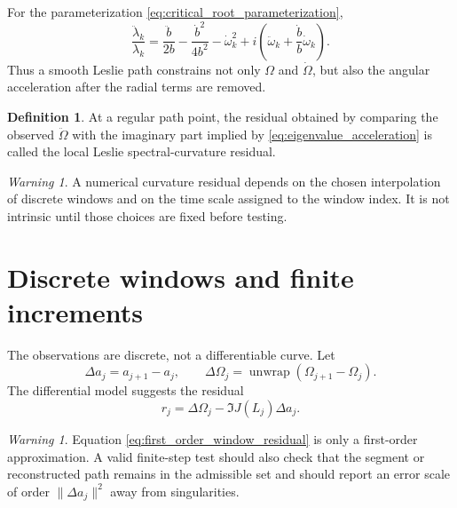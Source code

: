\documentclass[11pt]{amsart}
\numberwithin{equation}{section}
\theoremstyle{plain}
\theoremstyle{definition}
\newtheorem{definition}[theorem]{Definition}
\theoremstyle{remark}
\newtheorem{warning}[theorem]{Warning}
\begin{document}
For the parameterization \eqref{eq:critical_root_parameterization},
\begin{equation}
\frac{\ddot\lambda_k}{\lambda_k}
=
\frac{\ddot b}{2b}
-\frac{\dot b^2}{4b^2}
-\dot\omega_k^2
+i\left(
\ddot\omega_k+\frac{\dot b}{b}\dot\omega_k
\right).
\label{eq:angular_acceleration_identity}
\end{equation}
Thus a smooth Leslie path constrains not only $\Omega$ and $\dot\Omega$, but also the angular acceleration after the radial terms are removed.

\begin{definition}
\label{def:spectral_curvature}
At a regular path point, the residual obtained by comparing the observed $\ddot\Omega$ with the imaginary part implied by \eqref{eq:eigenvalue_acceleration} is called the local Leslie spectral-curvature residual.
\end{definition}

\begin{warning}
\label{warn:curvature_not_intrinsic}
A numerical curvature residual depends on the chosen interpolation of discrete windows and on the time scale assigned to the window index.  It is not intrinsic until those choices are fixed before testing.
\end{warning}

\section{Discrete windows and finite increments}
\label{sec:discrete_windows}

The observations are discrete, not a differentiable curve.  Let
\begin{equation}
\Delta a_j=a_{j+1}-a_j,
\qquad
\Delta\Omega_j=\operatorname{unwrap}(\Omega_{j+1}-\Omega_j).
\label{eq:window_increments}
\end{equation}
The differential model suggests the residual
\begin{equation}
r_j
=
\Delta\Omega_j-
\Im J(L_j)\Delta a_j.
\label{eq:first_order_window_residual}
\end{equation}

\begin{warning}
\label{warn:finite_increment}
Equation \eqref{eq:first_order_window_residual} is only a first-order approximation.  A valid finite-step test should also check that the segment or reconstructed path remains in the admissible set and should report an error scale of order $\|\Delta a_j\|^2$ away from singularities.
\end{warning}
\end{document}
